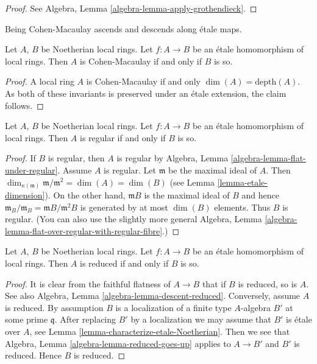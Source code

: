 \begin{proof}
See Algebra, Lemma \ref{algebra-lemma-apply-grothendieck}.
\end{proof}

\begin{proposition}
\label{proposition-etale-CM}
\begin{slogan}
Being Cohen-Macaulay ascends and descends along \'etale maps.
\end{slogan}
Let $A$, $B$ be Noetherian local rings.
Let $f : A \to B$ be an \'etale homomorphism of local rings.
Then $A$ is Cohen-Macaulay if and only if $B$ is so.
\end{proposition}

\begin{proof}
A local ring $A$ is Cohen-Macaulay if and only $\dim(A) = \text{depth}(A)$.
As both of these invariants is preserved under an \'etale extension,
the claim follows.
\end{proof}

\begin{proposition}
\label{proposition-etale-regular}
Let $A$, $B$ be Noetherian local rings.
Let $f : A \to B$ be an \'etale homomorphism of local rings.
Then $A$ is regular if and only if $B$ is so.
\end{proposition}

\begin{proof}
If $B$ is regular, then $A$ is regular by
Algebra, Lemma \ref{algebra-lemma-flat-under-regular}.
Assume $A$ is regular. Let $\mathfrak m$ be the maximal ideal
of $A$. Then $\dim_{\kappa(\mathfrak m)} \mathfrak m/\mathfrak m^2 =
\dim(A) = \dim(B)$ (see Lemma \ref{lemma-etale-dimension}).
On the other hand, $\mathfrak mB$ is the maximal ideal of
$B$ and hence $\mathfrak m_B/\mathfrak m_B = \mathfrak mB/\mathfrak m^2B$
is generated by at most $\dim(B)$ elements. Thus $B$ is regular.
(You can also use the slightly more general
Algebra, Lemma \ref{algebra-lemma-flat-over-regular-with-regular-fibre}.)
\end{proof}


\begin{proposition}
\label{proposition-etale-reduced}
Let $A$, $B$ be Noetherian local rings.
Let $f : A \to B$ be an \'etale homomorphism of local rings.
Then $A$ is reduced if and only if $B$ is so.
\end{proposition}

\begin{proof}
It is clear from the faithful flatness of $A \to B$ that if $B$ is reduced, so
is $A$. See also Algebra, Lemma \ref{algebra-lemma-descent-reduced}.
Conversely, assume $A$ is reduced. By assumption $B$ is a localization
of a finite type $A$-algebra $B'$ at some prime $\mathfrak q$.
After replacing $B'$ by a localization we may assume that $B'$
is \'etale over $A$, see Lemma \ref{lemma-characterize-etale-Noetherian}.
Then we see that Algebra, Lemma \ref{algebra-lemma-reduced-goes-up} applies to
$A \to B'$ and $B'$ is reduced. Hence $B$ is reduced.
\end{proof}

